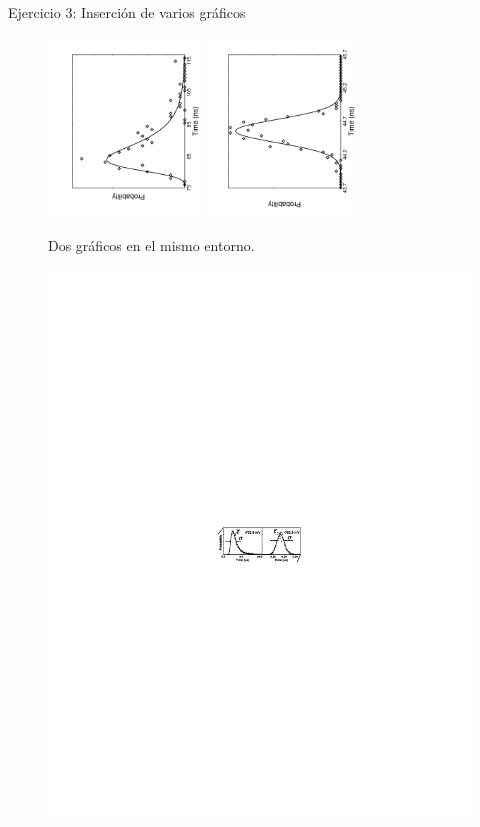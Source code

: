 \documentclass{beamer}
\begin{document}
\begin{frame}[fragile]
\begin{exampleblock}{Ejercicio 3: Inserci\'on de varios gr\'aficos}
\begin{figure}
\includegraphics[angle=270, width=4cm]{./graficos/fig_9.pdf}
\hspace{1cm}
\includegraphics[angle=270, width=4cm]{./graficos/fig_10.pdf}
\caption{Dos gr\'aficos en el mismo entorno.}
\end{figure}
\vspace{-12.5cm}
\begin{figure}[h]
\centerline{\includegraphics[width=20cm]{./graficos/reloc4.pdf}}

\end{figure}
\end{exampleblock}
\end{frame}
\end{document}
